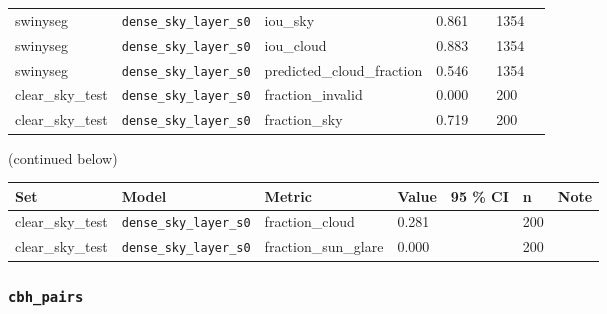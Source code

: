 \begin{center}
{\begin{tabular}{lllllll}
swinyseg & \texttt{dense\_\allowbreak{}sky\_\allowbreak{}layer\_\allowbreak{}s0} & iou\_sky & 0.861 &  & 1354 &  \\
swinyseg & \texttt{dense\_\allowbreak{}sky\_\allowbreak{}layer\_\allowbreak{}s0} & iou\_cloud & 0.883 &  & 1354 &  \\
swinyseg & \texttt{dense\_\allowbreak{}sky\_\allowbreak{}layer\_\allowbreak{}s0} & predicted\_cloud\_fraction & 0.546 &  & 1354 &  \\
clear\_sky\_test & \texttt{dense\_\allowbreak{}sky\_\allowbreak{}layer\_\allowbreak{}s0} & fraction\_invalid & 0.000 &  & 200 &  \\
clear\_sky\_test & \texttt{dense\_\allowbreak{}sky\_\allowbreak{}layer\_\allowbreak{}s0} & fraction\_sky & 0.719 &  & 200 &  \\
\bottomrule
\end{tabular}}\par\footnotesize(continued below)
\end{center}

\begin{center}{\scriptsize\setlength{\tabcolsep}{3pt}
\begin{tabular}{lllllll}
\toprule
Set & Model & Metric & Value & 95 \% CI & n & Note \\
\midrule
clear\_sky\_test & \texttt{dense\_\allowbreak{}sky\_\allowbreak{}layer\_\allowbreak{}s0} & fraction\_cloud & 0.281 &  & 200 &  \\
clear\_sky\_test & \texttt{dense\_\allowbreak{}sky\_\allowbreak{}layer\_\allowbreak{}s0} & fraction\_sun\_glare & 0.000 &  & 200 &  \\
\bottomrule
\end{tabular}}
\end{center}

\subsubsection{\texttt{cbh\_\allowbreak{}pairs}}

